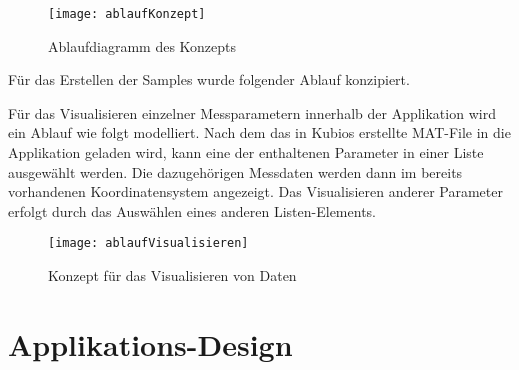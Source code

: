 \begin{figure}[H]
	\centering
	\texttt{[image: ablaufKonzept]}
	\caption{Ablaufdiagramm des Konzepts}
	\label{fig:ablaufKonzept}
\end{figure}

Für das Erstellen der Samples wurde folgender Ablauf konzipiert. %

Für das Visualisieren einzelner Messparametern innerhalb der Applikation wird ein Ablauf wie folgt modelliert. Nach dem das in Kubios erstellte MAT-File in die Applikation geladen wird, kann eine der enthaltenen Parameter in einer Liste ausgewählt werden. Die dazugehörigen Messdaten werden dann im bereits vorhandenen Koordinatensystem angezeigt. Das Visualisieren anderer Parameter erfolgt durch das Auswählen eines anderen Listen-Elements. 

\begin{figure}[H]
	\centering
	\texttt{[image: ablaufVisualisieren]}
	\caption{Konzept für das Visualisieren von Daten}
	\label{fig:ablaufVisualisieren}
\end{figure}

\section{Applikations-Design}


